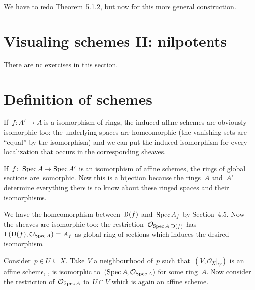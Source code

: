 \begin{exercise}
  \label{exercise:51d}
  We have to redo Theorem~5.1.2, but now for this more general construction.
\end{exercise}


\section{Visualing schemes II: nilpotents}

There are no exercises in this section.


\section{Definition of schemes}

\begin{exercise}
  If~$f\colon A'\to A$ is a isomorphism of rings, the induced affine schemes are obviously isomorphic too: the underlying spaces are homeomorphic (the vanishing sets are ``equal'' by the isomorphism) and we can put the induced isomorphism for every localization that occurs in the corresponding sheaves.

  If~$f\colon\operatorname{Spec} A\to\operatorname{Spec} A'$ is an isomorphism of affine schemes, the rings of global sections are isomorphic. Now this is a bijection because the rings~$A$ and~$A'$ determine everything there is to know about these ringed spaces and their isomorphisms.
\end{exercise}

\begin{exercise}
  We have the homeomorphism between~$\operatorname{D}(f)$ and~$\operatorname{Spec} A_f$ by Section~4.5. Now the sheaves are isomorphic too: the restriction~$\mathcal{O}_{\operatorname{Spec} A}|_{\operatorname{D}(f)}$ has~$\Gamma(\operatorname{D}(f),\mathcal{O}_{\operatorname{Spec} A})=A_f$ as global ring of sections which induces the desired isomorphism.
\end{exercise}

\begin{exercise}
  \label{exercise:53c}
  Consider~$p\in U\subseteq X$. Take~$V$ a neighbourhood of~$p$ such that~$(V,\mathcal{O}_X|_V)$ is an affine scheme, \ie, is isomorphic to~$(\operatorname{Spec} A,\mathcal{O}_{\operatorname{Spec} A})$ for some ring~$A$. Now consider the restriction of~$\mathcal{O}_{\operatorname{Spec} A}$ to~$U\cap V$ which is again an affine scheme.
\end{exercise}

